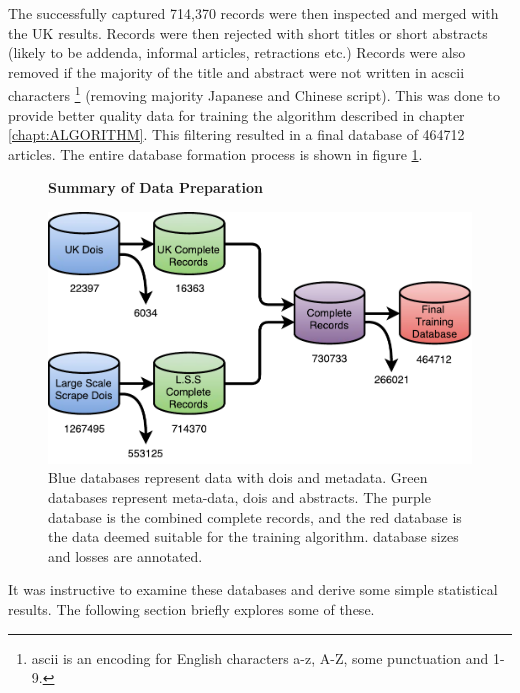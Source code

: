 The successfully captured 714,370 records were then inspected and merged with the UK results. Records were then rejected with short titles or short abstracts (likely to be addenda, informal articles, retractions etc.) Records were also removed if the majority of the title and abstract were not written in acscii characters \footnote{ascii is an encoding for English characters a-z, A-Z, some punctuation and 1-9.} (removing majority Japanese and Chinese script). This was done to provide better quality data for training the algorithm described in chapter \ref{chapt:ALGORITHM}. This filtering resulted in a final database of 464712 articles. The entire database formation process is shown in figure \ref{fig:DATABASES}.
\begin{figure}[H]
    \centering
    \textbf{Summary of Data Preparation}\par\medskip
    \includegraphics[scale=0.6]{Data_Acquisition/Databases.pdf}
    \caption{Blue databases represent data with dois and metadata. Green databases represent meta-data, dois and abstracts. The purple database is the combined complete records, and the red database is the data deemed suitable for the training algorithm. database sizes and losses are annotated.}
     \label{fig:DATABASES}
\end{figure}


It was instructive to examine these databases and derive some simple statistical results. The following section briefly explores some of these.

